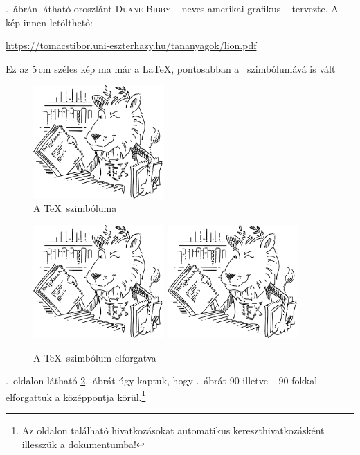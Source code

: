 \documentclass[a4paper,12pt]{article}
\begin{document}
	.~ábrán látható oroszlánt \textsc{Duane Bibby} -- neves amerikai grafikus --
	tervezte. A kép innen letölthető:
	\begin{center}
		\url{https://tomacstibor.uni-eszterhazy.hu/tananyagok/lion.pdf}
	\end{center}
	Ez az 5\,cm széles kép ma már a \LaTeX, pontosabban a \LaTeXe\ szimbólumává
	is vált
	\begin{figure}[ht!]
		\centering
		\includegraphics[width=5cm]{lion}
		\caption{A \TeX\ szimbóluma}
		\label{fig-lion}
	\end{figure}	
	
	\begin{figure}[ht!]
		\centering
		\includegraphics[width=5cm,angle=90,origin=c]{lion}%
		\includegraphics[width=5cm,angle=-90,origin=c]{lion}
		\caption{A \TeX\ szimbólum elforgatva}
		\label{fig-lion-forgatva}
	\end{figure}
	
	.~oldalon látható \ref{fig-lion-forgatva}.~ábrát úgy kaptuk, hogy .~ábrát 90 illetve $-90$
	fokkal elforgattuk a középpontja körül.\footnote{Az oldalon található hivatkozásokat automatikus kereszthivatkozásként illesszük a
		dokumentumba!}
	
\end{document}
